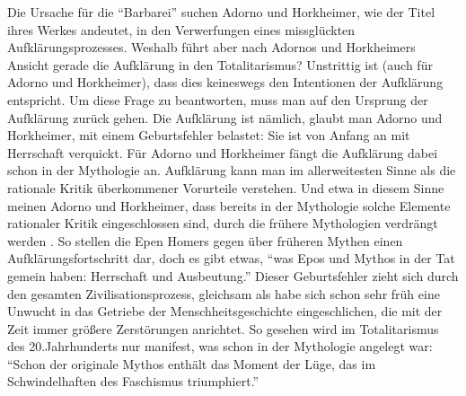 \documentclass[12pt,a4paper,ngerman]{article}
\begin{document}
Die Ursache für die "`Barbarei"' suchen Adorno und Horkheimer, wie
der Titel ihres Werkes andeutet, in den Verwerfungen eines
missglückten Aufklärungsprozesses. Weshalb führt aber nach Adornos und
Horkheimers Ansicht gerade die Aufklärung in den Totalitarismus?
Unstrittig ist (auch für Adorno und Horkheimer), dass dies keineswegs
den Intentionen der Aufklärung entspricht. Um diese Frage zu
beantworten, muss man auf den Ursprung der Aufklärung zurück
gehen. Die Aufklärung ist nämlich, glaubt man Adorno und Horkheimer,
mit einem Geburtsfehler belastet: Sie ist von Anfang an
mit Herrschaft verquickt. Für Adorno und Horkheimer fängt die
Aufklärung dabei schon in der Mythologie an. Aufklärung kann man im
allerweitesten Sinne als die rationale Kritik überkommener Vorurteile
verstehen. Und etwa in diesem Sinne meinen Adorno und Horkheimer, dass
bereits in der Mythologie solche Elemente rationaler Kritik
eingeschlossen sind, durch die frühere Mythologien verdrängt
werden \cite[S.14/15]{adorno-horkheimer:1947}. So stellen die Epen
Homers gegen über früheren Mythen einen Aufklärungsfortschritt dar,
doch es gibt etwas, "`was Epos und Mythos in der Tat gemein haben:
Herrschaft und Ausbeutung."' \cite[S.52]{adorno-horkheimer:1947}
Dieser Geburtsfehler zieht sich durch den gesamten
Zivilisationsprozess, gleichsam als habe sich schon sehr früh eine
Unwucht in das Getriebe der Menschheitsgeschichte eingeschlichen,
die mit der Zeit immer größere Zerstörungen anrichtet. So gesehen wird
im Totalitarismus des 20.Jahrhunderts nur manifest, was schon in der
Mythologie angelegt war: "`Schon der originale Mythos enthält das
Moment der Lüge, das im Schwindelhaften des Faschismus triumphiert."'
\cite[S. 52]{adorno-horkheimer:1947}
\end{document}
